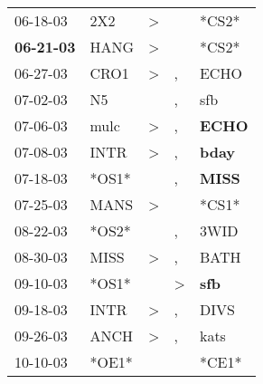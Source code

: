 \begin{supertabular}{p{0.07\textwidth}p{0.06\textwidth}p{0.02\textwidth}p{0.02\textwidth}p{0.06\textwidth}}
          06-18-03\textsuperscript{} &            2X2\textsuperscript{} &     \textgreater &                  &                            *CS2* \\
 \textbf{06-21-03\textsuperscript{}} &           HANG\textsuperscript{} &     \textgreater &                  &                            *CS2* \\
          06-27-03\textsuperscript{} &           CRO1\textsuperscript{} &     \textgreater &                , &           ECHO\textsuperscript{} \\
          07-02-03\textsuperscript{} &             N5\textsuperscript{} &                  &                , &            sfb\textsuperscript{} \\
          07-06-03\textsuperscript{} &           mulc\textsuperscript{} &     \textgreater &                , &  \textbf{ECHO\textsuperscript{}} \\
          07-08-03\textsuperscript{} &           INTR\textsuperscript{} &     \textgreater &                , &  \textbf{bday\textsuperscript{}} \\
          07-18-03\textsuperscript{} &                            *OS1* &                  &                , &  \textbf{MISS\textsuperscript{}} \\
          07-25-03\textsuperscript{} &           MANS\textsuperscript{} &     \textgreater &                  &                            *CS1* \\
          08-22-03\textsuperscript{} &                            *OS2* &                  &                , &           3WID\textsuperscript{} \\
          08-30-03\textsuperscript{} &           MISS\textsuperscript{} &     \textgreater &                , &           BATH\textsuperscript{} \\
          09-10-03\textsuperscript{} &                            *OS1* &                  &     \textgreater &   \textbf{sfb\textsuperscript{}} \\
          09-18-03\textsuperscript{} &           INTR\textsuperscript{} &     \textgreater &                , &           DIVS\textsuperscript{} \\
          09-26-03\textsuperscript{} &           ANCH\textsuperscript{} &     \textgreater &                , &           kats\textsuperscript{} \\
          10-10-03\textsuperscript{} &                            *OE1* &                  &                  &                            *CE1* \\

\end{supertabular}
